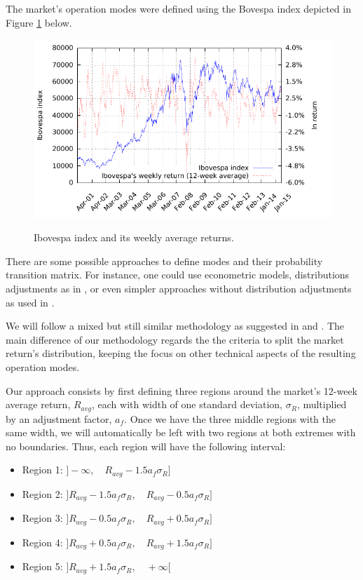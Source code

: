 The market's operation modes were defined using the Bovespa index depicted in Figure \ref{fig:ibovespa} below.
%
\begin{figure} [h!]
	\caption{Ibovespa index and its weekly average returns.}
	\centering
	\includegraphics[width=5.5in,keepaspectratio]{figures/ibov}
	\label{fig:ibovespa}
\end{figure}

There are some possible approaches to define modes and their probability transition matrix.
For instance, one could use econometric models, distributions adjustments as in \cite{oliveiraThesis}, or even simpler approaches without distribution adjustments as used in \cite{okimura2009}.

We will follow a mixed but still similar methodology as suggested in \cite{okimura2009} and \cite{oliveiraThesis}.
The main difference of our methodology regards the the criteria to split the market return's distribution, keeping the focus on other technical aspects of the resulting operation modes.

Our approach consists by first defining three regions around the market's 12-week average return, $R_{avg}$, each with width of one standard deviation, $\sigma_R$, multiplied by an adjustment factor, $a_f$.
Once we have the three middle regions with the same width, we will automatically be left with two regions at both extremes with no boundaries.
Thus, each region will have the following interval:
\begin{itemize}
	\item Region 1: $]-\infty ,\quad R_{avg} - 1.5 a_f \sigma_R]$
	\item Region 2: $]R_{avg} - 1.5 a_f \sigma_R ,\quad R_{avg} - 0.5 a_f \sigma_R]$
	\item Region 3: $]R_{avg} - 0.5 a_f \sigma_R ,\quad R_{avg} + 0.5 a_f \sigma_R]$
	\item Region 4: $]R_{avg} + 0.5 a_f \sigma_R ,\quad R_{avg} + 1.5 a_f \sigma_R]$
	\item Region 5: $]R_{avg} + 1.5 a_f \sigma_R ,\quad +\infty[$
\end{itemize}

